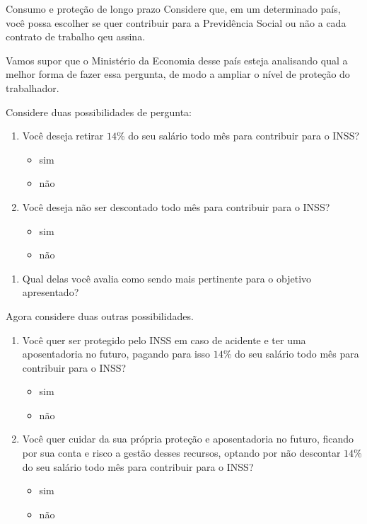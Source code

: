 \begin{task}{Consumo e proteção de longo prazo}
\label{consumo-longo-prazo}
Considere que, em um determinado país, você possa escolher se quer contribuir para a Previdência Social ou não a cada contrato de trabalho qeu assina.

Vamos supor que o Ministério da Economia desse país esteja analisando qual a melhor forma de fazer essa pergunta, de modo a ampliar o nível de proteção do trabalhador.

Considere duas possibilidades de pergunta:

\begin{enumerate}[label=\Roman*]
  \item Você deseja retirar $14$\% do seu salário todo mês para contribuir para o INSS?
  \begin{itemize}[label=(\hspace{1em})]
    \item sim
    \item não
  \end{itemize}
  \item Você deseja não ser descontado todo mês para contribuir para o INSS?
  \begin{itemize}[label=(\hspace{1em})]
    \item sim
    \item não
  \end{itemize}
\end{enumerate}

\begin{enumerate}
  \item Qual delas você avalia como sendo mais pertinente para o objetivo apresentado?
\end{enumerate}

Agora considere duas outras possibilidades.
\begin{enumerate}[label=\Roman*]
  \item Você quer ser protegido pelo INSS em caso de acidente e ter uma aposentadoria no futuro, pagando para isso $14$\% do seu salário todo mês para contribuir para o INSS?
  \begin{itemize}[label=(\hspace{1em})]
    \item sim
    \item não
  \end{itemize}
  \needspace{5em}
  \item Você quer cuidar da sua própria proteção e aposentadoria no futuro, ficando por sua conta e risco a gestão desses recursos, optando por não descontar $14$\% do seu salário todo mês para contribuir para o INSS?
  \begin{itemize}[label=(\hspace{1em})]
    \item sim
    \item não
  \end{itemize}
\end{enumerate}


\end{task}
